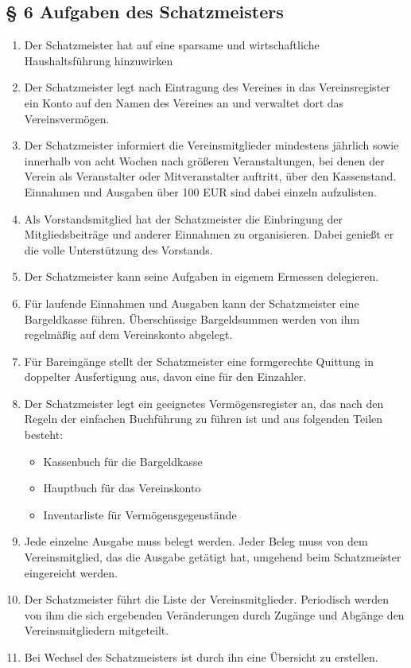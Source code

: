 \documentclass[10pt,a4paper]{article}
\begin{document}
\subsection*{§ 6 Aufgaben des Schatzmeisters}
\begin{enumerate}
\item Der Schatzmeister hat auf eine sparsame und wirtschaftliche
	Haushaltsführung hinzuwirken
\item Der Schatzmeister legt nach Eintragung des Vereines in das Vereinsregister
	ein Konto auf den Namen des Vereines an und verwaltet dort das
	Vereinsvermögen.
\item Der Schatzmeister informiert die Vereinsmitglieder mindestens
    jährlich sowie innerhalb von acht Wochen nach größeren
	Veranstaltungen, bei denen der Verein als Veranstalter oder
	Mitveranstalter auftritt, über den Kassenstand. Einnahmen und
	Ausgaben über 100 EUR sind dabei einzeln aufzulisten.
\item Als Vorstandsmitglied hat der Schatzmeister die Einbringung der
	Mitgliedsbeiträge und anderer Einnahmen zu organisieren. Dabei
	genießt er die volle Unterstützung des Vorstands.
\item Der Schatzmeister kann seine Aufgaben in eigenem Ermessen delegieren.
\item Für laufende Einnahmen und Ausgaben kann der Schatzmeister eine
    Bargeldkasse führen. Über\-schüs\-sige Bargeldsummen werden von ihm
	regelmäßig auf dem Vereinskonto abgelegt.
\item Für Bareingänge stellt der Schatzmeister eine formgerechte Quittung
	in doppelter Ausfertigung aus, davon eine für den Einzahler.
\item Der Schatzmeister legt ein geeignetes Vermögensregister an, das
	nach den Regeln der einfachen Buchführung zu führen ist und aus
	folgenden Teilen besteht:
	\begin{itemize}
	\item Kassenbuch für die Bargeldkasse
	\item Hauptbuch für das Vereinskonto
	\item Inventarliste für Vermögensgegenstände 
	\end{itemize}
\item Jede einzelne Ausgabe muss belegt werden. Jeder Beleg muss von
	dem Vereinsmitglied, das die Ausgabe getätigt hat, umgehend
	beim Schatzmeister eingereicht werden.
\item Der Schatzmeister führt die Liste der Vereinsmitglieder.
	Periodisch werden von ihm die sich ergebenden Veränderungen
	durch Zugänge und Abgänge den Vereinsmitgliedern mitgeteilt.
\item Bei Wechsel des Schatzmeisters ist durch ihn eine Übersicht zu erstellen.
\end{enumerate}
%
%
\end{document}
